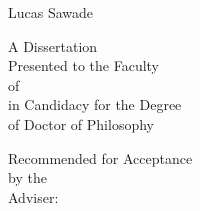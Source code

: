 \begin{titlepage}

\makeatletter
\thispagestyle{empty}
\sc
\vspace*{0in}
\begin{center}
  \LARGE \@title
\end{center}
\vspace{.6in}
\begin{center}
	Lucas Sawade
\end{center}
\vspace{.6in}
\begin{center}
  A Dissertation \\
  Presented to the Faculty \\
  of \@university \\
  in Candidacy for the Degree \\
  of Doctor of Philosophy
\end{center}
\vspace{.3in}
\begin{center}
  Recommended for Acceptance \\
  by the \@department \\
  Adviser: \@adviser
\end{center}
\vspace{.3in}
\begin{center}

\@date

\end{center}
\makeatother

\end{titlepage}